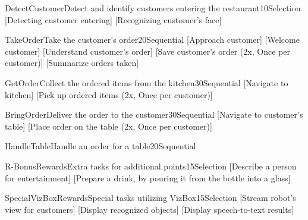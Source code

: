 
\begin{Group}{DetectCustomer}{Detect and identify customers entering the restaurant}{10}{Selection}
    [Detecting customer entering]
    [Recognizing customer's face]
\end{Group}

\begin{Group}{TakeOrder}{Take the customer's order}{20}{Sequential}
    [Approach customer]
    [Welcome customer]
    [Understand customer's order]
    [Save customer's order (2x, Once per customer)]
    [Summarize orders taken]
\end{Group}

\begin{Group}{GetOrder}{Collect the ordered items from the kitchen}{30}{Sequential}
    [Navigate to kitchen]
    [Pick up ordered items (2x, Once per customer)]
\end{Group}

\begin{Group}{BringOrder}{Deliver the order to the customer}{30}{Sequential}
    [Navigate to customer's table]
    [Place order on the table (2x, Once per customer)]
\end{Group}

\begin{Group}{HandleTable}{Handle an order for a table}{20}{Sequential}
\end{Group}


\begin{Group}{R-BonusRewards}{Extra tasks for additional points}{15}{Selection}
    [Describe a person for entertainment]
    [Prepare a drink, by pouring it from the bottle into a glass]
\end{Group}

\begin{Group}{SpecialVizBoxRewards}{Special tasks utilizing VizBox}{15}{Selection}
    [Stream robot's view for customers]
    [Display recognized objects]
    [Display speech-to-text results]
\end{Group}


